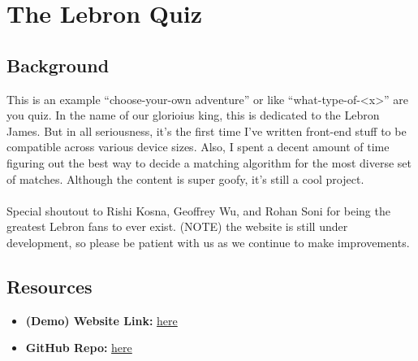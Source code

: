 \section{The Lebron Quiz}
\subsection{Background}
This is an example ``choose-your-own adventure'' or like ``what-type-of-<x>'' are you quiz. In the name of our glorioius king, this is dedicated to the Lebron James. But in all seriousness, it's the first time I've written front-end stuff to be compatible across various device sizes. Also, I spent a decent amount of time figuring out the best way to decide a matching algorithm for the most diverse set of matches. Although the content is super goofy, it's still a cool project.\\
\\
Special shoutout to Rishi Kosna, Geoffrey Wu, and Rohan Soni for being the greatest Lebron fans to ever exist. (NOTE) the website is still under development, so please be patient with us as we continue to make improvements.
\subsection{Resources}
\begin{itemize}
    \item \textbf{(Demo) Website Link:} \href{https://funny-lamington-875f6b.netlify.app/}{here}
    \item \textbf{GitHub Repo:} \href{https://github.com/connorli18/the-lebron-quiz}{here}
\end{itemize}